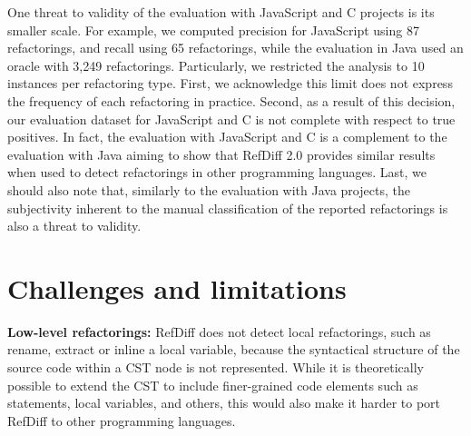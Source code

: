\documentclass[10pt,journal,compsoc]{IEEEtran}
\begin{document}
One threat to validity of the evaluation with JavaScript and C projects is its smaller scale.
For example, we computed precision for JavaScript using 87 refactorings, and  recall using 65 refactorings, while the evaluation in Java used an oracle with 3,249 refactorings.
Particularly, we restricted the analysis to 10 instances per refactoring type. First, we acknowledge this limit does not express the frequency of each refactoring in practice.  Second, as a result of this decision, our evaluation dataset for JavaScript and C is not complete with respect to true positives.
In fact, the evaluation with JavaScript and C is a complement to the evaluation with Java aiming to show that RefDiff 2.0 provides similar results when used to detect refactorings in other programming languages.
Last, we should also note that, similarly to the evaluation with Java projects, the subjectivity inherent to the manual classification of the reported refactorings is also a threat to validity.





\section{Challenges and limitations}
\label{sec:challenges}


\textbf{Low-level refactorings:} RefDiff does not detect local refactorings, such as rename, extract or inline a local variable, because the syntactical structure of the source code within a CST node is not represented.
While it is theoretically possible to extend the CST to include finer-grained code elements such as statements, local variables, and others, this would also make it harder to port RefDiff to other programming languages.
\end{document}
